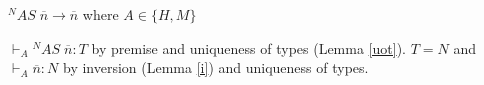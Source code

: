 \begin{case}
$^{N}AS\;\overline{n}\rightarrow\overline{n}$ where $A\in\lbrace H,M\rbrace$

$\vdash_{A}{^{N}A}S\;\overline{n}:T$ by premise and uniqueness of types (Lemma \ref{uot}).  $T=N$ and $\vdash_{A}\overline{n}:N$ by inversion (Lemma \ref{i}) and uniqueness of types.
\end{case}